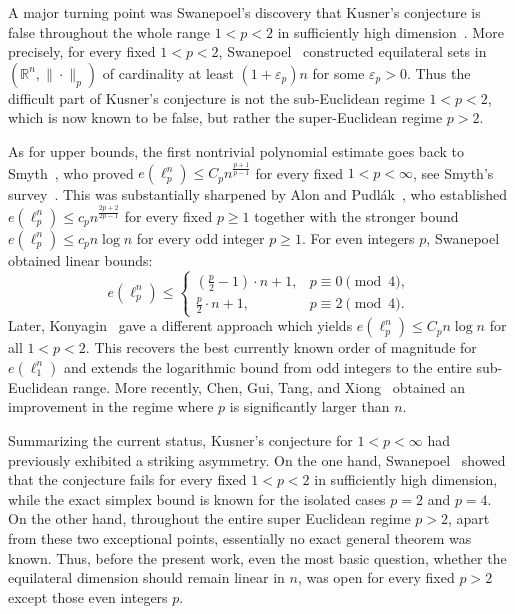 \documentclass[11pt]{article}
\theoremstyle{definition}
\begin{document}
A major turning point was Swanepoel's discovery that Kusner's conjecture is false throughout the whole range $1<p<2$ in sufficiently high dimension~\cite{2004ple2}. 
More precisely, for every fixed $1<p<2$, Swanepoel~\cite{2004ple2} constructed equilateral sets in $(\mathbb{R}^{n},\|\cdot\|_p)$ of cardinality at least $(1+\varepsilon_p)n$ for some $\varepsilon_p>0$. 
Thus the difficult part of Kusner's conjecture is not the sub-Euclidean regime $1<p<2$, which is now known to be false, but rather the super-Euclidean regime $p>2$.

As for upper bounds, the first nontrivial polynomial estimate goes back to Smyth~\cite{2001Smyth}, who proved
\(
e(\ell_p^n)\le C_{p}n^{\frac{p+1}{p-1}}
\)
for every fixed $1<p<\infty$, see Smyth's survey~\cite{2013Smyth}. 
This was substantially sharpened by Alon and Pudl\'ak~\cite{2003GAFA}, who established
\(
e(\ell_p^n)\le c_{p}n^{\frac{2p+2}{2p-1}}
\)
for every fixed \(p\ge 1\)
together with the stronger bound
\(
e(\ell_p^n)\le c_{p}n\log n
\)
for every odd integer $p\ge 1$. For even integers $p$, Swanepoel~\cite{2004ple2} obtained linear bounds:
\[
e(\ell_p^n)\le
\begin{cases}
\left(\frac{p}{2}-1\right)\cdot n+1, & p\equiv 0 \pmod 4,\\[1ex]
\frac{p}{2}\cdot n+1, & p\equiv 2 \pmod 4.
\end{cases}
\]
Later, Konyagin~\cite{2011Konyagin} gave a different approach which yields
\(
e(\ell_p^n)\le C_{p}n\log n\)
for all \(1<p<2.\)
This recovers the best currently known order of magnitude for $e(\ell_1^n)$ and extends the logarithmic bound from odd integers to the entire sub-Euclidean range. 
More recently, Chen, Gui, Tang, and Xiong~\cite{2022EUJC} obtained an improvement in the regime where $p$ is significantly larger than $n$.

Summarizing the current status, Kusner's conjecture for $1<p<\infty$ had previously exhibited a striking asymmetry. 
On the one hand, Swanepoel~\cite{2004ple2} showed that the conjecture fails for every fixed $1<p<2$ in sufficiently high dimension, while the exact simplex bound is known for the isolated cases $p=2$ and $p=4$. 
On the other hand, throughout the entire super Euclidean regime $p>2$, apart from these two exceptional points, essentially no exact general theorem was known. 
Thus, before the present work, even the most basic question, whether the equilateral dimension should remain linear in $n$, was open for every fixed $p>2$ except those even integers \(p.\)
\end{document}
